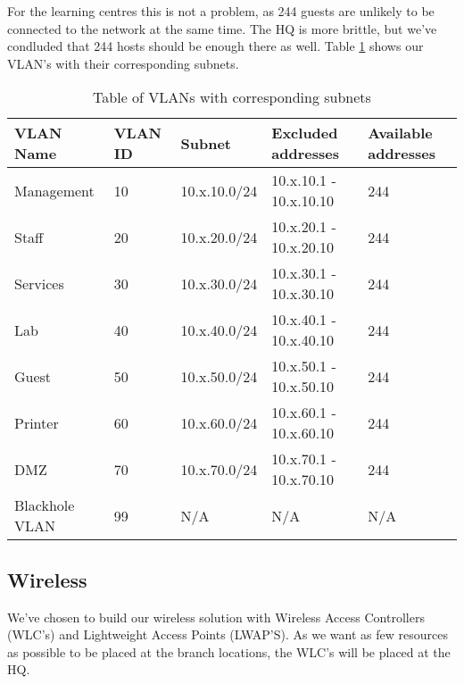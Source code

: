 For the learning centres this is not a problem, as 244 guests are unlikely to be connected to the network at the same time. The HQ is more brittle, but we've condluded that 244 hosts should be enough there as well. Table \ref{vlansubnettable} shows our VLAN's with their corresponding subnets.


\begin{table}[H]
\caption{Table of VLANs with corresponding subnets}
\label{vlansubnettable}
\begin{tabular}{|l|l|l|l|l|}
\hline
\textbf{VLAN Name} & \textbf{VLAN ID} & \textbf{Subnet} & \textbf{Excluded addresses} & \textbf{Available addresses} \\ \hline

Management     & 10      & 10.x.10.0/24 & 10.x.10.1 - 10.x.10.10 & 244 \\ \hline
Staff          & 20      & 10.x.20.0/24 & 10.x.20.1 - 10.x.20.10 & 244 \\ \hline
Services       & 30      & 10.x.30.0/24 & 10.x.30.1 - 10.x.30.10 & 244 \\ \hline
Lab            & 40      & 10.x.40.0/24 & 10.x.40.1 - 10.x.40.10 & 244 \\ \hline
Guest          & 50      & 10.x.50.0/24 & 10.x.50.1 - 10.x.50.10 & 244 \\ \hline
Printer        & 60      & 10.x.60.0/24 & 10.x.60.1 - 10.x.60.10 & 244 \\ \hline
DMZ            & 70      & 10.x.70.0/24 & 10.x.70.1 - 10.x.70.10 & 244 \\ \hline
Blackhole VLAN & 99      & N/A          & N/A                    & N/A \\ \hline
\end{tabular}
\end{table}

\subsection{Wireless}


We've chosen to build our wireless solution with Wireless Access Controllers (WLC's) and Lightweight Access Points (LWAP'S). As we want as few resources as possible to be placed at the branch locations, the WLC's will be placed at the HQ.

